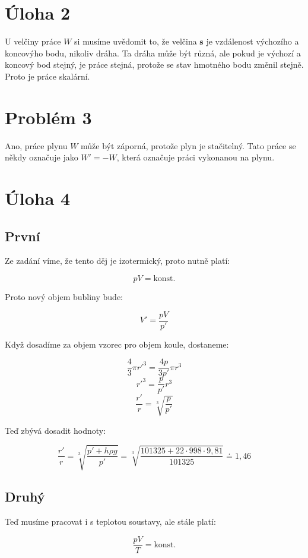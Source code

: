 \documentclass{fkssolpub}
\author{Ondřej Sedláček}
\begin{document}
\section{Úloha 2}

U velčiny práce $W$ si musíme uvědomit to, že velčina $\mathbf{s}$ je
vzdálenost výchozího a koncovýho bodu, nikoliv dráha. Ta dráha může být
různá, ale pokud je výchozí a koncový bod stejný, je práce stejná, protože
se stav hmotného bodu změnil stejně. Proto je práce skalární.

\section{Problém 3}

Ano, práce plynu $W$ může být záporná, protože plyn je stačitelný. Tato práce
se někdy označuje jako $W' = - W$, která označuje práci vykonanou na plynu.

\section{Úloha 4}

\subsection{První}

Ze zadání víme, že tento děj je izotermický, proto nutně platí:

\[
	p V = \text{konst.}
\]

Proto nový objem bubliny bude:

\[
	V' = \frac{p V}{p'}
\]

Když dosadíme za objem vzorec pro objem koule, dostaneme:

\[
	\frac{4}{3} \pi r'^3 = \frac{4 p}{3 p'} \pi r^3
\]
\[
	r'^3 = \frac{p}{p'} r^3
\]
\[
	\frac{r'}{r} = \sqrt[3]{\frac{p}{p'}}
\]

Teď zbývá dosadit hodnoty:

\[
	\frac{r'}{r} = \sqrt[3]{\frac{p' + h \rho g}{p'}}
	= \sqrt[3]{\frac{101325 + 22 \cdot 998 \cdot 9{,}81}{101325}}
	\doteq 1{,}46
\]

\subsection{Druhý}

Teď musíme pracovat i s teplotou soustavy, ale stále platí:

\[
	\frac{p V}{T} = \text{konst.}
\]
\end{document}
